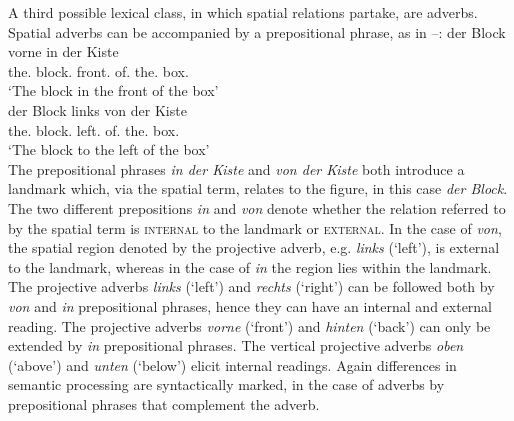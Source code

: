A third possible lexical class, in which spatial relations partake, are adverbs. 
Spatial adverbs can be accompanied
by a prepositional phrase, as in --:
\ea
\label{e:der-block-vorne-in-der-kiste}
\gll der Block vorne in der Kiste\\
the.{\NOM} block.{\NOM} front.{\ADV} of.{\PREP} the.{\DAT} box.{\DAT}\\
\glt `The block in the front of the box'\\
\z
\ea
\label{e:der-block-links-von-der-kiste}
\gll der Block links von der Kiste\\
the.{\NOM} block.{\NOM} left.{\ADV} of.{\PREP} the.{\DAT} box.{\DAT}\\
\glt `The block to the left of the box'\\
\z
The prepositional phrases \textit{in der Kiste} and \textit{von der Kiste}  both introduce
a landmark which, via
the spatial term, relates to the figure, in this case \textit{der Block}. The two different prepositions \textit{in} and \textit{von}
denote whether the relation referred to by the spatial term is \textsc{internal} 
to the landmark or \textsc{external}. In the case of \textit{von}, the spatial
region denoted by the projective adverb, e.g. \textit{links} (`left'), is external to the 
landmark, whereas in the case of \textit{in} the region lies within the landmark. 
The projective 
adverbs \textit{links} (`left') and \textit{rechts} (`right') can be followed both by 
\textit{von} and \textit{in} prepositional phrases, hence they can have an internal
and external reading. The projective adverbs \textit{vorne} (`front') 
and \textit{hinten} (`back') can only be extended by \textit{in} prepositional phrases. 
The vertical projective adverbs \textit{oben} (`above') and \textit{unten} (`below')
elicit internal readings. Again differences in semantic processing are 
syntactically marked, in the case of adverbs by prepositional phrases
that complement the adverb.


